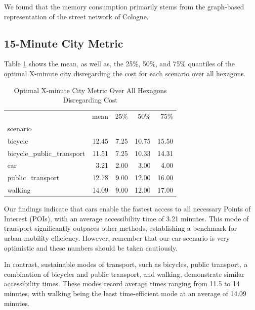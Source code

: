We found that the memory consumption primarily stems from the graph-based representation of the street network of Cologne.

\subsection{15-Minute City Metric}
\label{subsec:15_minute_city_metric}

Table \ref{tab:optimal_x_minute_city_metric} shows the mean, as well as, the 25\%, 50\%, and 75\% quantiles of the optimal X-minute city disregarding the cost for each scenario over all hexagons.

\begin{table}
  \caption{Optimal X-minute City Metric Over All Hexagons Disregarding Cost}
  \label{tab:optimal_x_minute_city_metric}
  \begin{center}
    \begin{tabular}{lrrrr}
       & mean & 25\% & 50\% & 75\% \\
      scenario &  &  &  &  \\
      bicycle & 12.45 & 7.25 & 10.75 & 15.50 \\
      bicycle\_public\_transport & 11.51 & 7.25 & 10.33 & 14.31 \\
      car & 3.21 & 2.00 & 3.00 & 4.00 \\
      public\_transport & 12.78 & 9.00 & 12.00 & 16.00 \\
      walking & 14.09 & 9.00 & 12.00 & 17.00 \\
    \end{tabular}
  \end{center}
\end{table}

Our findings indicate that cars enable the fastest access to all necessary Points of Interest (POIs), with an average accessibility time of 3.21 minutes. 
This mode of transport significantly outpaces other methods, establishing a benchmark for urban mobility efficiency.
However, remember that our car scenario is very optimistic and these numbers should be taken cautiously.

In contrast, sustainable modes of transport, such as bicycles, public transport, a combination of bicycles and public transport, and walking, demonstrate similar accessibility times. 
These modes record average times ranging from 11.5 to 14 minutes, with walking being the least time-efficient mode at an average of 14.09 minutes. 

